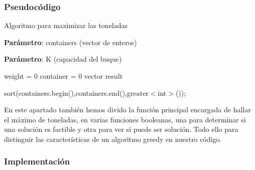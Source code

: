 \subsubsection{Pseudocódigo}

\begin{algorithm}[H]
    \caption{Algoritmo para maximizar las toneladas}\label{alg:max_toneladas}
    \begin{minipage}{0.92\textwidth}

    \textbf{Parámetro}: containers (vector de enteros)

    \textbf{Parámetro}: K (capacidad del buque)

    \end{minipage}

    weight = 0\;
	container = 0\;
    vector result\;
  
    sort(containers.begin(),containers.end(),greater$<$int$>$());

  

\end{algorithm}

En este apartado también hemos divido la función principal encargada de hallar el máximo de toneladas, en varias funciones
booleanas, una para determinar si una solución es factible y otra para ver si puede ser solución. Todo ello para distinguir 
las características de un algoritmo greedy en nuestro código.

\subsubsection{Implementación}

